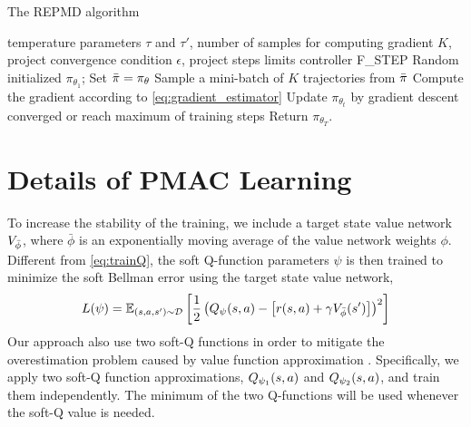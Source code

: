 \begin{algorithm}[t]
	\caption{\label{alg:repmd}  The REPMD algorithm}
	\begin{algorithmic}[1]
		\INPUT temperature parameters $\tau$ and $\tau'$, number of samples for computing gradient $K$, project convergence condition $\epsilon$, project steps limits controller F\_STEP
		\STATE Random initialized $\pi_{\theta_1}$;
		\STATE Set $\bar{\pi} = \pi_\theta$
		\REPEAT 
		\STATE Sample a mini-batch of $K$ trajectories from $\bar{\pi}$
		\STATE Compute the gradient according to \cref{eq:gradient_estimator}
		\STATE Update $\pi_{\theta_t}$ by gradient descent
		\UNTIL converged or reach maximum of training steps
		\ENDFOR
		\STATE Return $\pi_{\theta_T}$.
	\end{algorithmic}
\end{algorithm}


\section{Details of PMAC Learning}
\label{sec:implementationPMAC}
To increase the stability of the training, we include a target state value network $V_{\bar{\phi}}$, where $\bar{\phi}$ is an exponentially moving average of the value network weights $\phi$. 
Different from \cref{eq:trainQ}, the soft Q-function parameters $\psi$ is then trained to minimize the soft Bellman error using the target state value network,
\begin{equation}
L(\psi) = \mathbb{E}_{(s,a,s') \sim {\mathcal{D}}} \left[ \frac{1}{2} \left( Q_{\psi}(s,a) - \left[r(s,a) + \gamma V_{\bar{\phi}}(s') \right] \right)^2 \right]
\end{equation}
Our approach also use two soft-Q functions in order to mitigate the overestimation problem caused by value function approximation \citep{haarnoja2018soft,fujimoto2018addressing}. Specifically, we apply two soft-Q function approximations, $Q_{\psi_1}(s,a)$ and $Q_{\psi_2}(s,a)$, and train them independently.  The minimum of the two Q-functions will be used whenever the soft-Q value is needed. 


